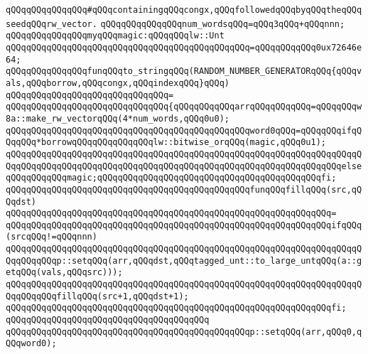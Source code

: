\verb|qQQqqQQqqQQqqQQq#qQQqcontainingqQQqcongx,qQQqfollowedqQQqbyqQQqtheqQQqseedqQQqrw_vector.|\newline
\newline
\verb|qQQqqQQqqQQqqQQqnum_wordsqQQq=qQQq3qQQq+qQQqnnn;|\newline
\newline
\verb|qQQqqQQqqQQqqQQqmyqQQqmagic:qQQqqQQqlw::Unt|\newline
\verb|qQQqqQQqqQQqqQQqqQQqqQQqqQQqqQQqqQQqqQQqqQQqqQQq=qQQqqQQqqQQq0ux72646e64;|\newline
\newline
\verb|qQQqqQQqqQQqqQQqfunqQQqto_stringqQQq(RANDOM_NUMBER_GENERATORqQQq{qQQqvals,qQQqborrow,qQQqcongx,qQQqindexqQQq}qQQq)|\newline
\verb|qQQqqQQqqQQqqQQqqQQqqQQqqQQqqQQq=|\newline
\verb|qQQqqQQqqQQqqQQqqQQqqQQqqQQqqQQq{qQQqqQQqqQQqarrqQQqqQQqqQQq=qQQqqQQqw8a::make_rw_vectorqQQq(4*num_words,qQQq0u0);|\newline
\newline
\verb|qQQqqQQqqQQqqQQqqQQqqQQqqQQqqQQqqQQqqQQqqQQqqQQqword0qQQq=qQQqqQQqifqQQqqQQq*borrowqQQqqQQqqQQqqQQqlw::bitwise_orqQQq(magic,qQQq0u1);|\newline
\verb|qQQqqQQqqQQqqQQqqQQqqQQqqQQqqQQqqQQqqQQqqQQqqQQqqQQqqQQqqQQqqQQqqQQqqQQqqQQqqQQqqQQqqQQqqQQqqQQqqQQqqQQqqQQqqQQqqQQqqQQqqQQqqQQqqQQqqQQqelseqQQqqQQqqQQqmagic;qQQqqQQqqQQqqQQqqQQqqQQqqQQqqQQqqQQqqQQqqQQqfi;|\newline
\newline
\verb|qQQqqQQqqQQqqQQqqQQqqQQqqQQqqQQqqQQqqQQqqQQqqQQqfunqQQqfillqQQq(src,qQQqdst)|\newline
\verb|qQQqqQQqqQQqqQQqqQQqqQQqqQQqqQQqqQQqqQQqqQQqqQQqqQQqqQQqqQQqqQQq=|\newline
\verb|qQQqqQQqqQQqqQQqqQQqqQQqqQQqqQQqqQQqqQQqqQQqqQQqqQQqqQQqqQQqqQQqifqQQq(srcqQQq!=qQQqnnn)|\newline
\verb|qQQqqQQqqQQqqQQqqQQqqQQqqQQqqQQqqQQqqQQqqQQqqQQqqQQqqQQqqQQqqQQqqQQqqQQqqQQqqQQqp::setqQQq(arr,qQQqdst,qQQqtagged_unt::to_large_untqQQq(a::getqQQq(vals,qQQqsrc)));|\newline
\verb|qQQqqQQqqQQqqQQqqQQqqQQqqQQqqQQqqQQqqQQqqQQqqQQqqQQqqQQqqQQqqQQqqQQqqQQqqQQqqQQqfillqQQq(src+1,qQQqdst+1);|\newline
\verb|qQQqqQQqqQQqqQQqqQQqqQQqqQQqqQQqqQQqqQQqqQQqqQQqqQQqqQQqqQQqqQQqfi;|\newline
\verb|qQQqqQQqqQQqqQQqqQQqqQQqqQQqqQQqqQQqqQQq|\newline
\verb|qQQqqQQqqQQqqQQqqQQqqQQqqQQqqQQqqQQqqQQqqQQqqQQqp::setqQQq(arr,qQQq0,qQQqword0);|\newline
